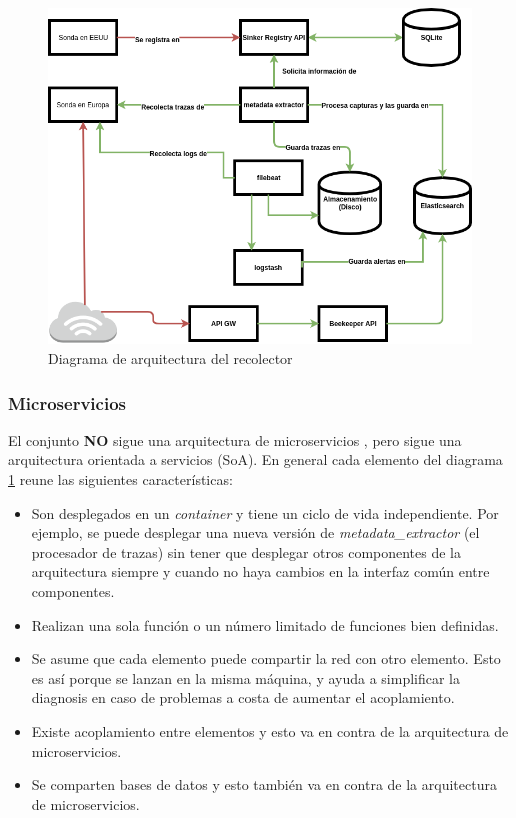 \begin{figure}[h]
    \centering
      \includegraphics[scale=0.5]{images/collector_architecture}
    \caption{Diagrama de arquitectura del recolector}
    \label{fig:arquitectura-recolector}
  \end{figure}

\subsubsection{Microservicios}

El conjunto \textbf{NO} sigue una arquitectura de microservicios \cite{fowler-microservices}, pero sigue una arquitectura
orientada a servicios (SoA). En general cada elemento del diagrama \ref{fig:arquitectura-recolector} reune las siguientes
características:

\begin{itemize}
    \item Son desplegados en un \emph{container} y tiene un ciclo de vida independiente. Por ejemplo, se puede desplegar una nueva
    versión de \emph{metadata\_extractor} (el procesador de trazas) sin tener que desplegar otros componentes de la arquitectura
    siempre y cuando no haya cambios en la interfaz común entre componentes.
    \item Realizan una sola función o un número limitado de funciones bien definidas.
    \item Se asume que cada elemento puede compartir la red con otro elemento. Esto es así porque se lanzan en la misma máquina, y ayuda
    a simplificar la diagnosis en caso de problemas a costa de aumentar el acoplamiento.
    \item Existe acoplamiento entre elementos y esto va en contra de la arquitectura de microservicios.
    \item Se comparten bases de datos y esto también va en contra de la arquitectura de microservicios.
\end{itemize}

